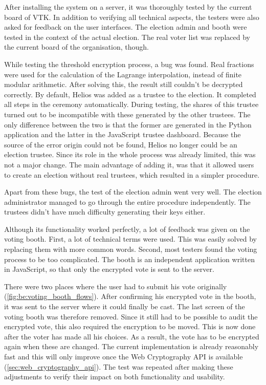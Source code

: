 After installing the system on a server, it was thoroughly tested by the current board of VTK. In addition to verifying all technical aspects, the testers were also asked for feedback on the user interfaces. The election admin and booth were tested in the context of the actual election. The real voter list was replaced by the current board of the organisation, though.

\par While testing the threshold encryption process, a bug was found. Real fractions were used for the calculation of the Lagrange interpolation, instead of finite modular arithmetic. After solving this, the result still couldn't be decrypted correctly. By default, Helios was added as a trustee to the election. It completed all steps in the ceremony automatically. During testing, the shares of this trustee turned out to be incompatible with these generated by the other trustees. The only difference between the two is that the former are generated in the Python application and the latter in the JavaScript trustee dashboard. Because the source of the error origin could not be found, Helios no longer could be an election trustee. Since its role in the whole process was already limited, this was not a major change. The main advantage of adding it, was that it allowed users to create an election without real trustees, which resulted in a simpler procedure.

\par Apart from these bugs, the test of the election admin went very well. The election administrator managed to go through the entire procedure independently. The trustees didn't have much difficulty generating their keys either.

\par Although its functionality worked perfectly, a lot of feedback was given on the voting booth. First, a lot of technical terms were used. This was easily solved by replacing them with more common words. Second, most testers found the voting process to be too complicated. The booth is an independent application written in JavaScript, so that only the encrypted vote is sent to the server.

\par There were two places where the user had to submit his vote originally (\ref{fig:be:voting_booth_flows}). After confirming his encrypted vote in the booth, it was sent to the server where it could finally be cast. The last screen of the voting booth was therefore removed. Since it still had to be possible to audit the encrypted vote, this also required the encryption to be moved. This is now done after the voter has made all his choices. As a result, the vote has to be encrypted again when these are changed. The current implementation is already reasonably fast and this will only improve once the Web Cryptography API is available (\ref{sec:web_cryptography_api}). The test was repeated after making these adjustments to verify their impact on both functionality and usability.
 
